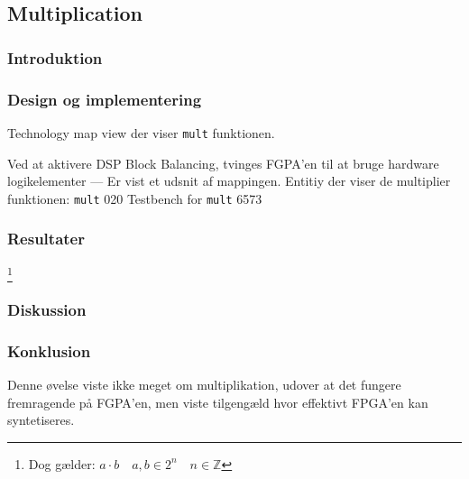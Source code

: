 \subsection{Multiplication}

\subsubsection{Introduktion}

\subsubsection{Design og implementering}




{Technology map view der viser \texttt{mult} funktionen.}


{Ved at aktivere DSP Block Balancing, tvinges FGPA'en til at bruge hardware logikelementer --- Er vist et udsnit af mappingen.}
{Entitiy der viser de multiplier funktionen: \texttt{mult}}
{0}{20}
{Testbench for \texttt{mult}}
{65}{73}

\subsubsection{Resultater}



\footnote{Dog gælder: $a\cdot b \quad a,b \in 2^n \quad n \in \mathbb{Z}$}
\subsubsection{Diskussion}

\subsubsection{Konklusion}
Denne øvelse viste ikke meget om multiplikation, udover at det fungere fremragende på FGPA'en, men viste tilgengæld hvor effektivt FPGA'en kan syntetiseres.